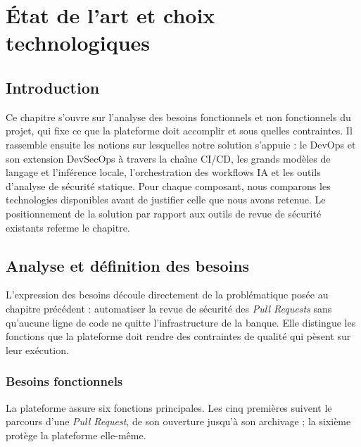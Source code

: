 \chapter{État de l'art et choix technologiques}

\section*{Introduction}

Ce chapitre s'ouvre sur l'analyse des besoins fonctionnels et non fonctionnels du
projet, qui fixe ce que la plateforme doit accomplir et sous quelles contraintes. Il
rassemble ensuite les notions sur lesquelles notre solution s'appuie : le DevOps et son
extension DevSecOps à travers la chaîne CI/CD, les grands modèles de langage et
l'inférence locale, l'orchestration des workflows IA et les outils d'analyse de
sécurité statique. Pour chaque composant, nous comparons les technologies disponibles
avant de justifier celle que nous avons retenue. Le positionnement de la solution par
rapport aux outils de revue de sécurité existants referme le chapitre.

\section{Analyse et définition des besoins}

    L'expression des besoins découle directement de la problématique posée au chapitre
    précédent : automatiser la revue de sécurité des \textit{Pull Requests} sans
    qu'aucune ligne de code ne quitte l'infrastructure de la banque. Elle distingue les
    fonctions que la plateforme doit rendre des contraintes de qualité qui pèsent sur
    leur exécution.

    \subsection{Besoins fonctionnels}

        La plateforme assure six fonctions principales. Les cinq premières suivent le
        parcours d'une \textit{Pull Request}, de son ouverture jusqu'à son archivage ;
        la sixième protège la plateforme elle-même.

